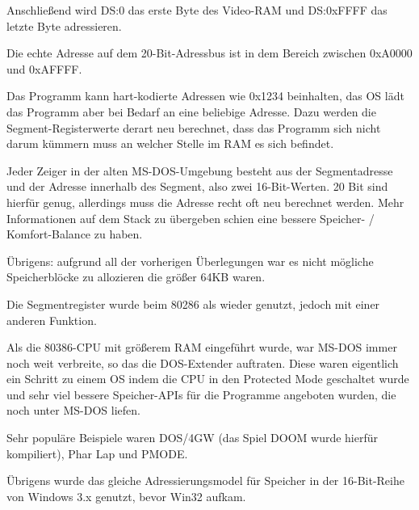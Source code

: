 Anschließend wird DS:0 das erste Byte des Video-RAM und DS:0xFFFF das letzte
Byte adressieren.

Die echte Adresse auf dem 20-Bit-Adressbus ist in dem Bereich zwischen 0xA0000
und 0xAFFFF.

Das Programm kann hart-kodierte Adressen wie 0x1234 beinhalten, das \ac{OS} lädt
das Programm aber bei Bedarf an eine beliebige Adresse. Dazu werden die Segment-Registerwerte
derart neu berechnet, dass das Programm sich nicht darum kümmern muss an welcher
Stelle im RAM es sich befindet.

Jeder Zeiger in der alten MS-DOS-Umgebung besteht aus der Segmentadresse und der
Adresse innerhalb des Segment, also zwei 16-Bit-Werten. 20 Bit sind hierfür genug,
allerdings muss die Adresse recht oft neu berechnet werden. Mehr Informationen auf
dem Stack zu übergeben schien eine bessere Speicher- / Komfort-Balance zu haben.

Übrigens: aufgrund all der vorherigen Überlegungen war es nicht mögliche Speicherblöcke
zu allozieren die größer 64KB waren.


Die Segmentregister wurde beim 80286 als  wieder genutzt, jedoch mit
einer anderen Funktion.


Als die 80386-CPU mit größerem \ac{RAM} eingeführt wurde, war MS-DOS immer noch
weit verbreite, so das die DOS-Extender auftraten. Diese waren eigentlich ein
Schritt zu einem  \ac{OS} indem die CPU in den Protected Mode geschaltet
wurde und sehr viel bessere Speicher-\ac{API}s für die Programme angeboten wurden,
die noch unter MS-DOS liefen.

Sehr populäre Beispiele waren DOS/4GW (das Spiel DOOM wurde hierfür kompiliert),
Phar Lap und PMODE.
\par
{}

Übrigens wurde das gleiche Adressierungsmodel für Speicher in der 16-Bit-Reihe von
Windows 3.x genutzt, bevor Win32 aufkam.
